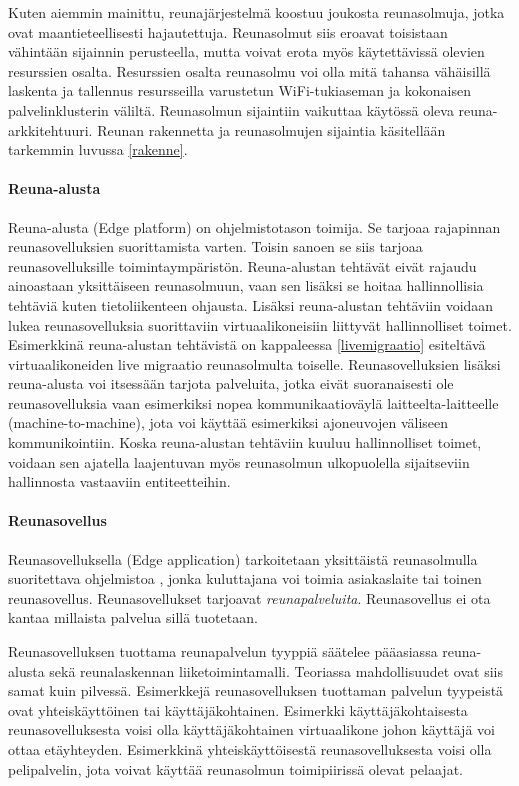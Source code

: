 Kuten aiemmin mainittu, reunajärjestelmä koostuu joukosta reunasolmuja, jotka ovat maantieteellisesti hajautettuja.
Reunasolmut siis eroavat toisistaan vähintään sijainnin perusteella, mutta voivat erota myös käytettävissä olevien resurssien osalta. Resurssien osalta reunasolmu voi olla mitä tahansa vähäisillä laskenta ja tallennus resursseilla varustetun WiFi-tukiaseman ja kokonaisen palvelinklusterin väliltä.
Reunasolmun sijaintiin vaikuttaa käytössä oleva reuna-arkkitehtuuri.
Reunan rakennetta ja reunasolmujen sijaintia käsitellään tarkemmin luvussa \ref{rakenne}.

\paragraph{Reuna-alusta}
Reuna-alusta (Edge platform) on ohjelmistotason toimija. Se tarjoaa rajapinnan reunasovelluksien suorittamista varten\cite{etsirefarch}. Toisin sanoen se siis tarjoaa reunasovelluksille toimintaympäristön.
Reuna-alustan tehtävät eivät rajaudu ainoastaan yksittäiseen reunasolmuun, vaan sen lisäksi se hoitaa hallinnollisia tehtäviä kuten tietoliikenteen ohjausta. Lisäksi reuna-alustan tehtäviin voidaan lukea reunasovelluksia suorittaviin virtuaalikoneisiin liittyvät hallinnolliset toimet. Esimerkkinä reuna-alustan tehtävistä on kappaleessa \ref{livemigraatio} esiteltävä virtuaalikoneiden live migraatio reunasolmulta toiselle.
Reunasovelluksien lisäksi reuna-alusta voi itsessään tarjota palveluita, jotka eivät suoranaisesti ole reunasovelluksia vaan esimerkiksi nopea kommunikaatioväylä laitteelta-laitteelle (machine-to-machine), jota voi käyttää esimerkiksi ajoneuvojen väliseen kommunikointiin.
Koska reuna-alustan tehtäviin kuuluu hallinnolliset toimet, voidaan sen ajatella laajentuvan myös reunasolmun ulkopuolella sijaitseviin hallinnosta vastaaviin entiteetteihin.

\paragraph{Reunasovellus}
Reunasovelluksella (Edge application) tarkoitetaan yksittäistä reunasolmulla suoritettava ohjelmistoa \cite{etsirefarch}, jonka kuluttajana voi toimia asiakaslaite tai toinen reunasovellus. Reunasovellukset tarjoavat \textit{reunapalveluita}.
Reunasovellus ei ota kantaa millaista palvelua sillä tuotetaan.

Reunasovelluksen tuottama reunapalvelun tyyppiä säätelee pääasiassa reuna-alusta sekä reunalaskennan liiketoimintamalli. Teoriassa mahdollisuudet ovat siis samat kuin pilvessä.
Esimerkkejä reunasovelluksen tuottaman palvelun tyypeistä ovat yhteiskäyttöinen tai käyttäjäkohtainen.
Esimerkki käyttäjäkohtaisesta reunasovelluksesta voisi olla käyttäjäkohtainen virtuaalikone johon käyttäjä voi ottaa etäyhteyden. Esimerkkinä yhteiskäyttöisestä reunasovelluksesta voisi olla pelipalvelin, jota voivat käyttää reunasolmun toimipiirissä olevat pelaajat.

